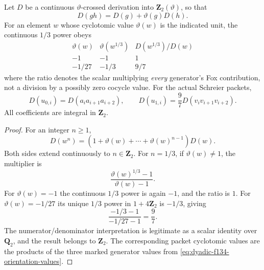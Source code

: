 \begin{lemma}
\label{lem:dyadic-f134-twisted-cubic-fox}
Let $D$ be a continuous
$\vartheta$-crossed
derivation into
$\mathbf Z_2(\vartheta)$,
so that
\[
D(gh)=D(g)+\vartheta(g)D(h).
\]
For an element $w$
whose cyclotomic
value $\vartheta(w)$
is the indicated
unit, the continuous
$1/3$ power obeys
\begin{equation}\label{eq:dyadic-f134-cuberoot-fox-factors}
\boxed{
\begin{array}{c|c|c}
\vartheta(w)&\vartheta(w^{1/3})&
D(w^{1/3})/D(w)\\ \hline
-1&-1&1\\
-1/27&-1/3&9/7
\end{array}}
\end{equation}
where the ratio denotes
the scalar multiplying
\emph{every} generator's
Fox contribution, not a
division by a possibly
zero cocycle value.
For the actual
Schreier packets,
\[
D(u_{0,i})=D(a_i a_{i+1}a_{i+2}),\qquad
D(u_{1,i})=
\frac97D(v_i v_{i+1}v_{i+2}).
\]
All coefficients are
integral in $\mathbf Z_2$.
\end{lemma}

\begin{proof}
For an integer $n\ge1$,
\[
D(w^n)=
(1+\vartheta(w)+\cdots+
\vartheta(w)^{n-1})D(w).
\]
Both sides extend
continuously to
$n\in\mathbf Z_2$.
For $n=1/3$, if
$\vartheta(w)\ne1$,
the multiplier is
\[
\frac{\vartheta(w)^{1/3}-1}
{\vartheta(w)-1}.
\]
For $\vartheta(w)=-1$
the continuous $1/3$ power
is again $-1$,
and the ratio is $1$.
For $\vartheta(w)=-1/27$
its unique $1/3$ power
in $1+4\mathbf Z_2$
is $-1/3$, giving
\[
\frac{-1/3-1}{-1/27-1}
=\frac97.
\]
The numerator/denominator
interpretation is legitimate
as a scalar identity
over $\mathbf Q_2$, and
the result belongs to
$\mathbf Z_2$.
The corresponding
packet cyclotomic values
are the products of the
three marked generator
values from
\eqref{eq:dyadic-f134-orientation-values}.
\end{proof}

